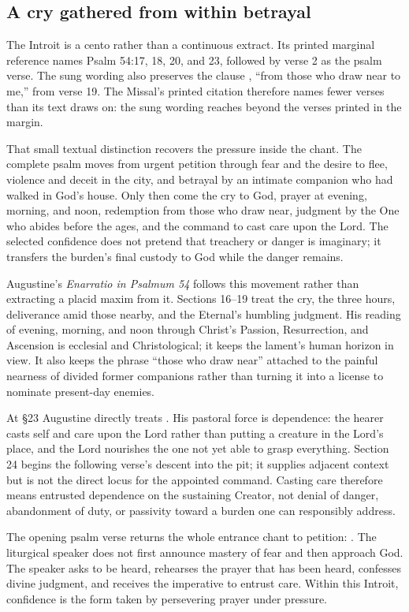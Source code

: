 \subsection*{A cry gathered from within betrayal\enspace{}}

The Introit is a cento rather than a continuous extract. Its printed marginal
reference names Psalm 54:17, 18, 20, and 23, followed by verse 2 as the psalm
verse. The sung wording also preserves the clause , ``from those who draw near to me,'' from verse 19. The
Missal's printed citation therefore names fewer verses than its text draws on:
the sung wording reaches beyond the verses printed in the margin.

That small textual distinction recovers the pressure inside the chant. The
complete psalm moves from urgent petition through fear and the desire to flee,
violence and deceit in the city, and betrayal by an intimate companion who had
walked in God's house. Only then come the cry to God, prayer at evening,
morning, and noon, redemption from those who draw near, judgment by the One
who abides before the ages, and the command to cast care upon the Lord. The
selected confidence does not pretend that treachery or danger is imaginary;
it transfers the burden's final custody to God while the danger remains.

Augustine's \emph{Enarratio in Psalmum 54} follows this movement rather than
extracting a placid maxim from it. Sections 16--19 treat the cry, the three
hours, deliverance amid those nearby, and the Eternal's humbling judgment.
His reading of evening, morning, and noon through Christ's Passion,
Resurrection, and Ascension is ecclesial and Christological; it keeps the
lament's human horizon in view. It also keeps the phrase ``those who draw near'' attached to the
painful nearness of divided former companions rather than turning it into a
license to nominate present-day enemies.

At §23 Augustine directly treats . His
pastoral force is dependence: the hearer casts self and care upon the Lord
rather than putting a creature in the Lord's place, and the Lord nourishes the
one not yet able to grasp everything. Section 24 begins the following verse's
descent into the pit; it supplies adjacent context but is not the direct locus
for the appointed command. Casting care therefore means entrusted dependence
on the sustaining Creator, not denial of danger, abandonment of duty, or
passivity toward a burden one can responsibly address.

The opening psalm verse returns the whole entrance chant to petition:
. The liturgical speaker does not first
announce mastery of fear and then approach God. The speaker asks to be heard,
rehearses the prayer that has been heard, confesses divine judgment, and
receives the imperative to entrust care. Within this Introit, confidence is
the form taken by persevering prayer under pressure.
